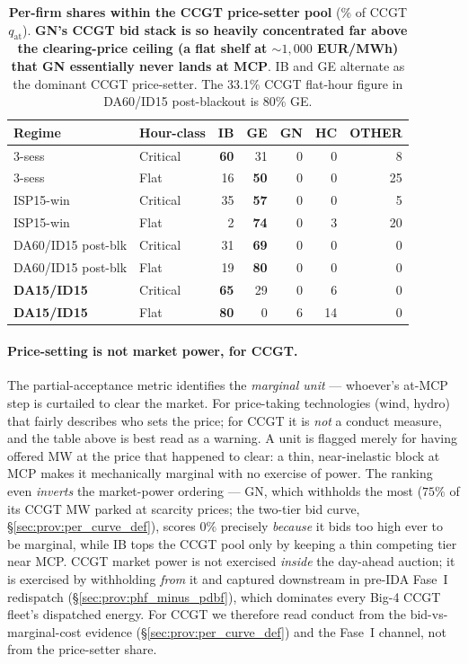 \documentclass[11pt,a4paper]{article}
\begin{document}
\begin{table}[H]
\centering\scriptsize
\setlength{\tabcolsep}{5pt}
\begin{tabular}{l l r r r r r}
\toprule
Regime & Hour-class & IB & GE & GN & HC & OTHER \\
\midrule
3-sess & Critical & \textbf{60} & 31 & 0 & 0 & 8 \\
3-sess & Flat & 16 & \textbf{50} & 0 & 0 & 25 \\
ISP15-win & Critical & 35 & \textbf{57} & 0 & 0 & 5 \\
ISP15-win & Flat & 2 & \textbf{74} & 0 & 3 & 20 \\
DA60/ID15 post-blk & Critical & 31 & \textbf{69} & 0 & 0 & 0 \\
DA60/ID15 post-blk & Flat & 19 & \textbf{80} & 0 & 0 & 0 \\
\textbf{DA15/ID15} & Critical & \textbf{65} & 29 & 0 & 6 & 0 \\
\textbf{DA15/ID15} & Flat & \textbf{80} & 0 & 6 & 14 & 0 \\
\bottomrule
\end{tabular}
\caption{\textbf{Per-firm shares within the CCGT price-setter pool} (\% of CCGT $q_{\text{at}}$). \textbf{GN's CCGT bid stack is so heavily concentrated far above the clearing-price ceiling (a flat shelf at $\sim\!1{,}000$ EUR/MWh) that GN essentially never lands at MCP}. IB and GE alternate as the dominant CCGT price-setter. The 33.1\% CCGT flat-hour figure in DA60/ID15 post-blackout is 80\% GE.}
\label{tab:ccgt_by_firm}
\end{table}

\paragraph{Price-setting is not market power, for CCGT.} The partial-acceptance metric identifies the \emph{marginal unit} --- whoever's at-MCP step is curtailed to clear the market. For price-taking technologies (wind, hydro) that fairly describes who sets the price; for CCGT it is \emph{not} a conduct measure, and the table above is best read as a warning. A unit is flagged merely for having offered MW at the price that happened to clear: a thin, near-inelastic block at MCP makes it mechanically marginal with no exercise of power. The ranking even \emph{inverts} the market-power ordering --- GN, which withholds the most ($75\%$ of its CCGT MW parked at scarcity prices; the two-tier bid curve, \S\ref{sec:prov:per_curve_def}), scores $0\%$ precisely \emph{because} it bids too high ever to be marginal, while IB tops the CCGT pool only by keeping a thin competing tier near MCP. CCGT market power is not exercised \emph{inside} the day-ahead auction; it is exercised by withholding \emph{from} it and captured downstream in pre-IDA Fase~I redispatch (\S\ref{sec:prov:phf_minus_pdbf}), which dominates every Big-4 CCGT fleet's dispatched energy. For CCGT we therefore read conduct from the bid-vs-marginal-cost evidence (\S\ref{sec:prov:per_curve_def}) and the Fase~I channel, not from the price-setter share.
\end{document}
